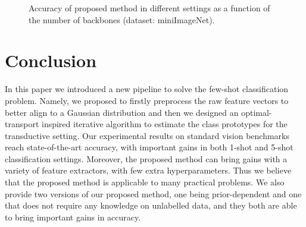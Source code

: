 \documentclass[review]{elsarticle}
\begin{document}
\begin{figure}[h]
  \begin{center}
  \end{center}
  \vspace{-.5cm}
  \caption{Accuracy of proposed method in different settings as a function of the number of backbones (dataset: miniImageNet).}
  \label{fig:functionofb}
\end{figure}

\section{Conclusion}
\label{conclusion}

In this paper we introduced a new pipeline to solve the few-shot classification problem. Namely, we proposed to firstly preprocess the raw feature vectors to better align to a Gaussian distribution and then we designed an optimal-transport inspired iterative algorithm to estimate the class prototypes for the transductive setting. Our experimental results on standard vision benchmarks reach state-of-the-art accuracy, with important gains in both 1-shot and 5-shot classification settings. Moreover, the proposed method can bring gains with a variety of feature extractors, with few extra hyperparameters. Thus we believe that the proposed method is applicable to many practical problems. We also provide two versions of our proposed method, one being prior-dependent and one that does not require any knowledge on unlabelled data, and they both are able to bring important gains in accuracy.


\end{document}
